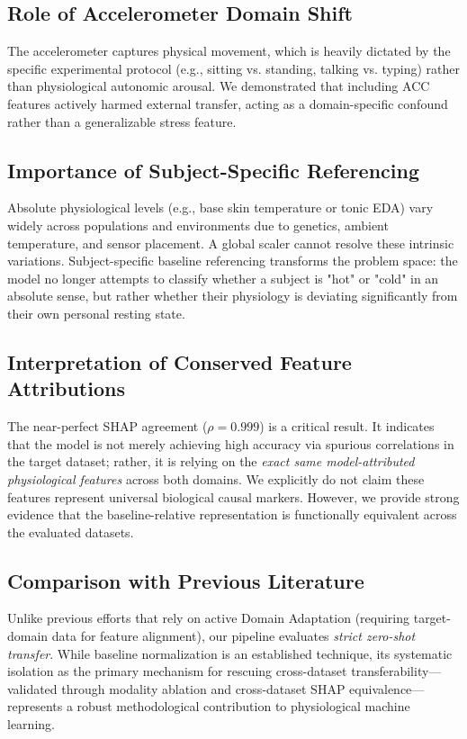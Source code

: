 \documentclass[journal]{IEEEtran}
\begin{document}
\subsection{Role of Accelerometer Domain Shift}
The accelerometer captures physical movement, which is heavily dictated by the specific experimental protocol (e.g., sitting vs. standing, talking vs. typing) rather than physiological autonomic arousal. We demonstrated that including ACC features actively harmed external transfer, acting as a domain-specific confound rather than a generalizable stress feature.

\subsection{Importance of Subject-Specific Referencing}
Absolute physiological levels (e.g., base skin temperature or tonic EDA) vary widely across populations and environments due to genetics, ambient temperature, and sensor placement. A global scaler cannot resolve these intrinsic variations. Subject-specific baseline referencing transforms the problem space: the model no longer attempts to classify whether a subject is "hot" or "cold" in an absolute sense, but rather whether their physiology is deviating significantly from their own personal resting state. 

\subsection{Interpretation of Conserved Feature Attributions}
The near-perfect SHAP agreement ($\rho = 0.999$) is a critical result. It indicates that the model is not merely achieving high accuracy via spurious correlations in the target dataset; rather, it is relying on the \textit{exact same model-attributed physiological features} across both domains. We explicitly do not claim these features represent universal biological causal markers. However, we provide strong evidence that the baseline-relative representation is functionally equivalent across the evaluated datasets.

\subsection{Comparison with Previous Literature}
Unlike previous efforts that rely on active Domain Adaptation (requiring target-domain data for feature alignment), our pipeline evaluates \textit{strict zero-shot transfer}. While baseline normalization is an established technique, its systematic isolation as the primary mechanism for rescuing cross-dataset transferability—validated through modality ablation and cross-dataset SHAP equivalence—represents a robust methodological contribution to physiological machine learning.
\end{document}
